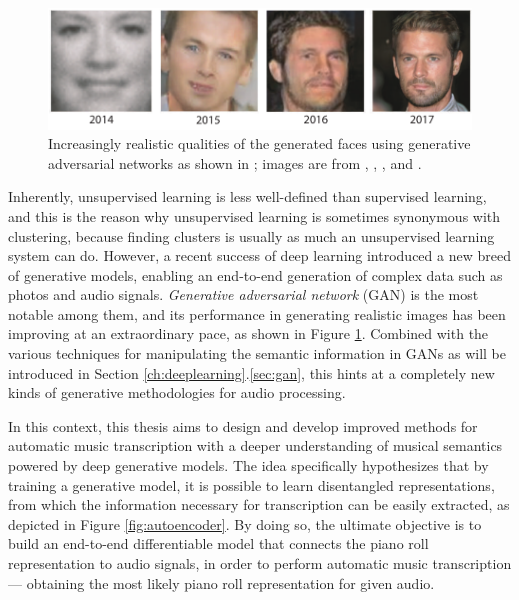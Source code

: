 \begin{figure}
	\includegraphics[width=\textwidth]{generative-evolution.pdf}
	\caption{Increasingly realistic qualities of the generated faces using generative adversarial networks as shown in \protect\cite{brundage2018malicious}; images are from \protect\cite{goodfellow2014gan}, \protect\cite{radford2015dcgan}, \protect\cite{liu2016cogan}, and \protect\cite{karras2017pggan}.}
	\label{fig:generative-evolution}
\end{figure}


Inherently, unsupervised learning is less well-defined than supervised learning, and this is the reason why unsupervised learning is sometimes synonymous with clustering, because finding clusters is usually as much an unsupervised learning system can do.
However, a recent success of deep learning introduced a new breed of generative models, enabling an end-to-end generation of complex data such as photos and audio signals.
\emph{Generative adversarial network} (GAN) \cite{goodfellow2014gan} is the most notable among them, and its performance in generating realistic images has been improving at an extraordinary pace, as shown in Figure \ref{fig:generative-evolution}.
Combined with the various techniques for manipulating the semantic information in GANs as will be introduced in Section \ref{ch:deeplearning}.\ref{sec:gan}, this hints at a completely new kinds of generative methodologies for audio processing.


In this context, this thesis aims to design and develop improved methods for automatic music transcription with a deeper understanding of musical semantics powered by deep generative models.
The idea specifically hypothesizes that by training a generative model, it is possible to learn disentangled representations, from which the information necessary for transcription can be easily extracted, as depicted in Figure \ref{fig:autoencoder}.
By doing so, the ultimate objective is to build an end-to-end differentiable model that connects the piano roll representation to audio signals, in order to perform automatic music transcription --- obtaining the most likely piano roll representation for given audio.


